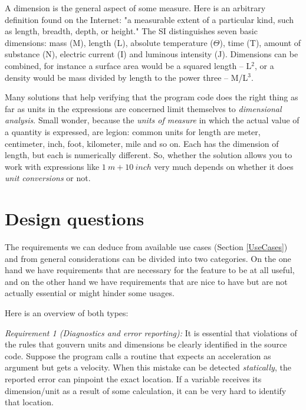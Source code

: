 \documentclass{article}
\begin{document}
A dimension is the general aspect of some measure. Here is an arbitrary definition found on the Internet:
"a measurable extent of a particular kind, such as length, breadth, depth, or height." The SI distinguishes seven
basic dimensions: mass (M), length (L), absolute temperature ($\Theta$), time (T), amount of substance (N), electric current (I)
and luminous intensity (J). Dimensions can be combined, for instance a surface area would be a squared length -- L$^2$, or
a density would be mass divided by length to the power three -- M/L$^3$.

Many solutions that help verifying that the program code does the right thing as far as units in the expressions are concerned
limit themselves to \emph{dimensional analysis}. Small wonder, because the \emph{units of measure} in which the actual
value of a quantity is expressed, are legion: common units for length are meter, centimeter, inch, foot, kilometer, mile and
so on. Each has the dimension of length, but each is numerically different. So, whether the solution allows you to work with
expressions like $1~m + 10~inch$ very much depends on whether it does \emph{unit conversions} or not.


\section{Design questions}
The requirements we can deduce from available use cases (Section \ref{UseCases}) and from general considerations can be divided
into two categories. On the one hand we have requirements that are necessary for the feature to be at all useful, and
on the other hand we have requirements that are nice to have but are not actually essential or might
hinder some usages.

Here is an overview of both types:

\vspace{\baselineskip}
\noindent \emph{Requirement 1 (Diagnostics and error reporting):}
It is essential that violations of the rules that gouvern units and dimensions be clearly identified in the
source code. Suppose the program calls a routine that expects an acceleration as argument but gets a velocity.
When this mistake can be detected \emph{statically}, the reported error can pinpoint the exact location. If
a variable receives its dimension/unit as a result of some calculation, it can be very hard to identify that
location.
\end{document}

